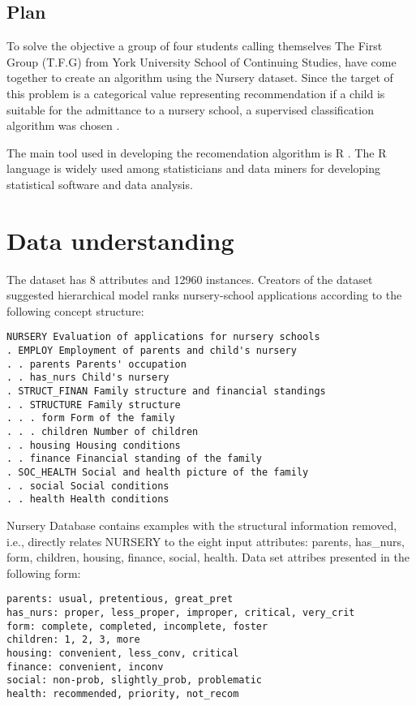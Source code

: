 \hypertarget{plan}{%
\subsection{Plan}\label{plan}}

To solve the objective a group of four students calling themselves The
First Group (T.F.G) from York University School of Continuing Studies,
have come together to create an algorithm using the Nursery dataset.
Since the target of this problem is a categorical value representing
recommendation if a child is suitable for the admittance to a nursery
school, a supervised classification algorithm was chosen
\citep{witten_data_2011}.

The main tool used in developing the recomendation algorithm is R
\citep{R}. The R language is widely used among statisticians and data
miners for developing statistical software and data analysis.

\hypertarget{data-understanding}{%
\section{Data understanding}\label{data-understanding}}

The dataset \citep{noauthor_uci_nodate} has 8 attributes and 12960
instances. Creators of the dataset suggested hierarchical model ranks
nursery-school applications according to the following concept
structure:

\begin{verbatim}
NURSERY Evaluation of applications for nursery schools 
. EMPLOY Employment of parents and child's nursery 
. . parents Parents' occupation 
. . has_nurs Child's nursery 
. STRUCT_FINAN Family structure and financial standings 
. . STRUCTURE Family structure 
. . . form Form of the family 
. . . children Number of children 
. . housing Housing conditions 
. . finance Financial standing of the family 
. SOC_HEALTH Social and health picture of the family 
. . social Social conditions 
. . health Health conditions 
\end{verbatim}

Nursery Database contains examples with the structural information
removed, i.e., directly relates NURSERY to the eight input attributes:
parents, has\_nurs, form, children, housing, finance, social, health.
Data set attribes presented in the following form:

\begin{verbatim}
parents: usual, pretentious, great_pret 
has_nurs: proper, less_proper, improper, critical, very_crit 
form: complete, completed, incomplete, foster 
children: 1, 2, 3, more 
housing: convenient, less_conv, critical 
finance: convenient, inconv 
social: non-prob, slightly_prob, problematic 
health: recommended, priority, not_recom
\end{verbatim}

